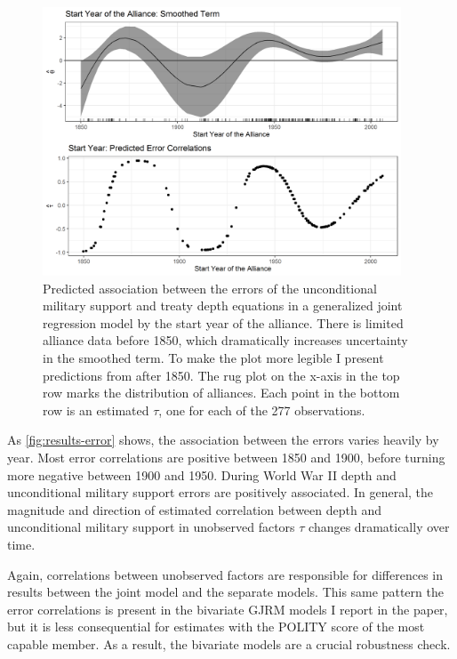 \documentclass[12pt]{article}
\begin{document}
\begin{figure}[hbtp]
\centering
\includegraphics[width=0.95\textwidth]{results-error.png}
\caption{Predicted association between the errors of the unconditional military support and treaty depth equations in a generalized joint regression model by the start year of the alliance. There is limited alliance data before 1850, which dramatically increases uncertainty in the smoothed term. To make the plot more legible I present predictions from after 1850. The rug plot on the x-axis in the top row marks the distribution of alliances. Each point in the bottom row is an estimated $\tau$, one for each of the 277 observations.}
\label{fig:results-error}
\end{figure}


As \autoref{fig:results-error} shows, the association between the errors varies heavily by year. 
Most error correlations are positive between 1850 and 1900, before turning more negative between 1900 and 1950. 
During World War II depth and unconditional military support errors are positively associated. 
In general, the magnitude and direction of estimated correlation between depth and unconditional military support in unobserved factors $\tau$ changes dramatically over time.  


Again, correlations between unobserved factors are responsible for differences in results between the joint model and the separate models. 
This same pattern the error correlations is present in the bivariate GJRM models I report in the paper, but it is less consequential for estimates with the POLITY score of the most capable member. 
As a result, the bivariate models are a crucial robustness check. 
\end{document}
